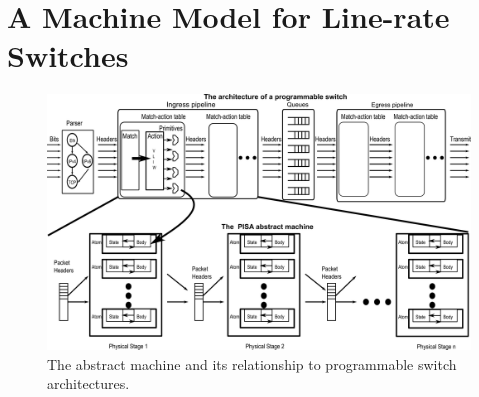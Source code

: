 \section{A Machine Model for Line-rate Switches}
\label{s:absmachine}

\begin{figure}[!t]
  \includegraphics[width=\textwidth]{pisa.pdf}
  \caption{The \absmachine abstract machine and its relationship to
  programmable switch architectures.}
  \label{fig:switch}
\end{figure}



